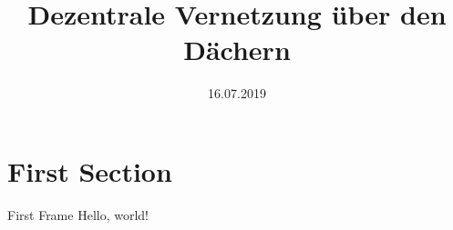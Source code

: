\documentclass{beamer}
\title{Dezentrale Vernetzung über den Dächern}
\date{16.07.2019}
\institute{Freifunk Franken}
\begin{document}
  \maketitle
  \section{First Section}
  \begin{frame}{First Frame}
    Hello, world!
  \end{frame}
\end{document}
